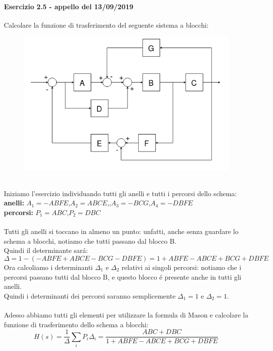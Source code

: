 \documentclass[12pt,a4paper]{article}
\begin{document}
	\paragraph*{Esercizio 2.5 - appello del 13/09/2019} Calcolare la funzione di trasferimento del seguente sistema a blocchi:
	\begin{figure}[h!]
		\centering
		\includegraphics[scale=0.5]{./images/schema25.png}
	\end{figure}
	\\
	Iniziamo l'esercizio individuando tutti gli anelli e tutti i percorsi dello schema:
	\textbf{anelli:} $A_1 = -ABFE$,\quad$A_2 = ABCE$,\quad,$A_3=-BCG$,\quad$A_4 = -DBFE$\\
	\textbf{percorsi:} $P_1 = ABC$,\quad$P_2=DBC$\\ \\
	Tutti gli anelli si toccano in almeno un punto: unfatti, anche senza guardare lo schema a blocchi, notiamo che tutti passano dal blocco B.\\
	Quindi il determinante sar\'a:
	\[
		\Delta = 1-(-ABFE+ABCE-BCG-DBFE) = 1+ABFE-ABCE+BCG+DBFE
	\]
	Ora calcoliamo i determinanti $\Delta_1$ e $\Delta_2$ relativi ai singoli percorsi: notiamo che i percorsi passano tutti dal blocco B, e questo blocco \'e presente anche in tutti gli anelli. \\Quindi i determinanti dei percorsi saranno semplicemente $\Delta_1 = 1$ e $\Delta_2 = 1$.\\ \\
	Adesso abbiamo tutti gli elementi per utilizzare la formula di Mason e calcolare la funzione  di trasferimento dello schema a blocchi:
	\[
		H(s) = \frac{1}{\Delta}\sum_i P_i \Delta_i = \frac{ABC + DBC}{1+ABFE - ABCE + BCG + DBFE}
	\]
	\newpage
\end{document}
